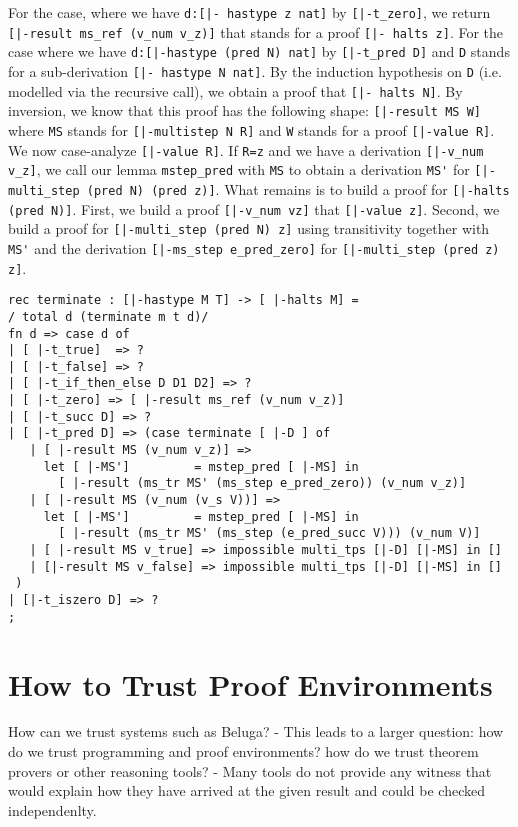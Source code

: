 For the case, where we have \lstinline!d:[|- hastype z nat]! by
\lstinline![|-t_zero]!, we return \lstinline![|-result ms_ref (v_num v_z)]! that
stands for a proof \lstinline![|- halts z]!. For the case where we have
\lstinline!d:[|-hastype (pred N) nat]! by \lstinline![|-t_pred D]! and
\lstinline!D! stands for a sub-derivation \lstinline![|- hastype N nat]!. By the
induction hypothesis on \lstinline!D! (i.e. modelled via the recursive call), we
obtain a proof that \lstinline![|- halts N]!.  By inversion, we know that this
proof has the following shape: \lstinline![|-result MS W]! where \lstinline!MS!
stands for \lstinline![|-multistep N R]! and \lstinline!W!
stands for a proof \lstinline![|-value R]!. We now case-analyze
\lstinline![|-value R]!. If \lstinline!R=z! and we have a derivation
\lstinline![|-v_num v_z]!, we call our lemma \lstinline!mstep_pred! with
\lstinline!MS! to obtain a derivation \lstinline!MS'! for
\lstinline![|-multi_step (pred N) (pred z)]!. What remains is to build a proof
for \lstinline![|-halts (pred N)]!. First, we build a proof \lstinline![|-v_num vz]!
that \lstinline![|-value z]!. Second, we build a proof for
\lstinline![|-multi_step (pred N) z]! using transitivity together with
\lstinline!MS'! and the derivation \lstinline![|-ms_step e_pred_zero]! for
\lstinline![|-multi_step (pred z) z]!.


\begin{lstlisting}
rec terminate : [|-hastype M T] -> [ |-halts M] =
/ total d (terminate m t d)/
fn d => case d of
| [ |-t_true]  => ?
| [ |-t_false] => ?
| [ |-t_if_then_else D D1 D2] => ?
| [ |-t_zero] => [ |-result ms_ref (v_num v_z)]
| [ |-t_succ D] => ?
| [ |-t_pred D] => (case terminate [ |-D ] of
   | [ |-result MS (v_num v_z)] =>
     let [ |-MS']         = mstep_pred [ |-MS] in
       [ |-result (ms_tr MS' (ms_step e_pred_zero)) (v_num v_z)]
   | [ |-result MS (v_num (v_s V))] =>
     let [ |-MS']         = mstep_pred [ |-MS] in
       [ |-result (ms_tr MS' (ms_step (e_pred_succ V))) (v_num V)]
   | [ |-result MS v_true] => impossible multi_tps [|-D] [|-MS] in []
   | [|-result MS v_false] => impossible multi_tps [|-D] [|-MS] in []
 )
| [|-t_iszero D] => ?
;
\end{lstlisting}



\section{How to Trust Proof Environments}
How can we trust systems such as Beluga? - This leads to a larger question: how do we trust programming and proof environments? how do we trust theorem provers or other reasoning tools? - Many tools do not provide any witness that would explain how they have arrived at the given result and could be checked independenlty.

